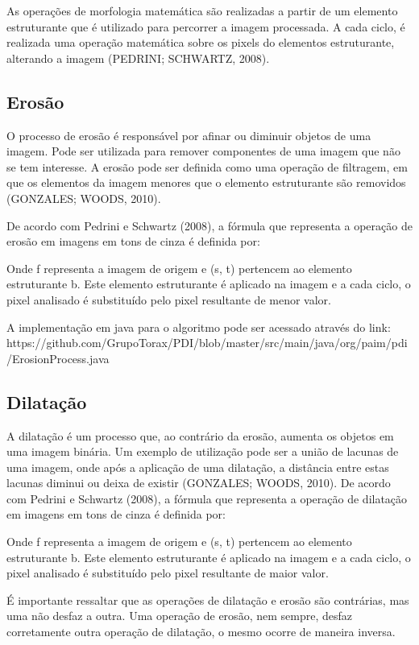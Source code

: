 \documentclass[
	12pt,				%
	oneside,			%
	a4paper,			%
	english,			%
	french,				%
	spanish,			%
	brazil,				%
	]{abntex2}
\begin{document}
As operações de morfologia matemática são realizadas a partir de um elemento estruturante que é utilizado para percorrer a imagem processada. A cada ciclo, é realizada uma operação matemática sobre os pixels do elementos estruturante, alterando a imagem (PEDRINI; SCHWARTZ, 2008).

\subsection{Erosão}
O processo de erosão é responsável por afinar ou diminuir objetos de uma imagem. Pode ser utilizada para remover componentes de uma imagem que não se tem interesse. A erosão pode ser definida como uma operação de filtragem, em que os elementos da imagem menores que o elemento estruturante são removidos (GONZALES; WOODS, 2010).

De acordo com Pedrini e Schwartz (2008), a fórmula que representa a operação de erosão em imagens em tons de cinza é definida por:

Onde f representa a imagem de origem e (s, t) pertencem ao elemento estruturante b. Este elemento estruturante é aplicado na imagem e a cada ciclo, o pixel analisado é substituído pelo pixel resultante de menor valor.

A implementação em java para o algoritmo pode ser acessado através do link:
https://github.com/GrupoTorax/PDI/blob/master/src/main/java/org/paim/pdi/ErosionProcess.java 

\subsection{Dilatação}

A dilatação é um processo que, ao contrário da erosão, aumenta os objetos em uma imagem binária. Um exemplo de utilização pode ser a união de lacunas de uma imagem, onde após a aplicação de uma dilatação, a distância entre estas lacunas diminui ou deixa de existir (GONZALES; WOODS, 2010). 
De acordo com Pedrini e Schwartz (2008), a fórmula que representa a operação de dilatação em imagens em tons de cinza é definida por:

Onde f representa a imagem de origem e (s, t) pertencem ao elemento estruturante b. Este elemento estruturante é aplicado na imagem e a cada ciclo, o pixel analisado é substituído pelo pixel resultante de maior valor.

É importante ressaltar que as operações de dilatação e erosão são contrárias, mas uma não desfaz a outra. Uma operação de erosão, nem sempre, desfaz corretamente outra operação de dilatação, o mesmo ocorre de maneira inversa.
\end{document}
